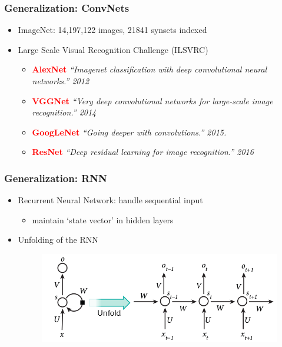 \documentclass[serif,mathserif]{beamer}
\begin{document}
\begin{frame}
  \frametitle{Generalization: ConvNets}
  \begin{itemize}
  \item ImageNet: 14,197,122 images, 21841 synsets indexed
  \item Large Scale Visual Recognition Challenge (ILSVRC)
    \begin{itemize}
    \item \textbf{\textcolor{red}{AlexNet}}
      \emph{``Imagenet classification with deep convolutional neural networks.'' 2012}
    \item \textbf{\textcolor{red}{VGGNet}}
      \emph{``Very deep convolutional networks for large-scale image recognition.'' 2014}
    \item \textbf{\textcolor{red}{GoogLeNet}}
      \emph{``Going deeper with convolutions.'' 2015.}
    \item \textbf{\textcolor{red}{ResNet}}
      \emph{``Deep residual learning for image recognition.'' 2016}
    \end{itemize}
  \end{itemize}
\end{frame}

\begin{frame}
  \frametitle{Generalization: RNN}
  \begin{itemize}
  \item Recurrent Neural Network: handle sequential input
    \begin{itemize}
    \item maintain `state vector' in hidden layers
    \end{itemize}
  \item Unfolding of the RNN
    \begin{figure}
      \centering
      \includegraphics[width=\textwidth]{img/unfolding}
    \end{figure}
  \end{itemize}
\end{frame}

\begin{frame} 
\end{frame}
\end{document}
